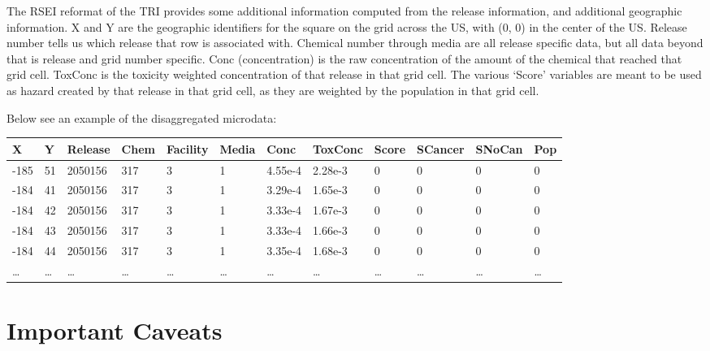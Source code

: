 \documentclass[12pt,twoside]{dukestatscithesis}
\theoremstyle{definition}
\theoremstyle{definition}
\theoremstyle{definition}
\theoremstyle{remark}
\begin{document}
The RSEI reformat of the TRI provides some additional information
computed from the release information, and additional geographic
information. X and Y are the geographic identifiers for the square on
the grid across the US, with (0, 0) in the center of the US. Release
number tells us which release that row is associated with. Chemical
number through media are all release specific data, but all data beyond
that is release and grid number specific. Conc (concentration) is the
raw concentration of the amount of the chemical that reached that grid
cell. ToxConc is the toxicity weighted concentration of that release in
that grid cell. The various `Score' variables are meant to be used as
hazard created by that release in that grid cell, as they are weighted
by the population in that grid cell.

Below see an example of the disaggregated microdata:
\begin{longtable}[]{@{}llllllllllll@{}}
\toprule
X & Y & Release & Chem & Facility & Media & Conc & ToxConc & Score &
SCancer & SNoCan & Pop\tabularnewline
\midrule
\endhead
-185 & 51 & 2050156 & 317 & 3 & 1 & 4.55e-4 & 2.28e-3 & 0 & 0 & 0 &
0\tabularnewline
-184 & 41 & 2050156 & 317 & 3 & 1 & 3.29e-4 & 1.65e-3 & 0 & 0 & 0 &
0\tabularnewline
-184 & 42 & 2050156 & 317 & 3 & 1 & 3.33e-4 & 1.67e-3 & 0 & 0 & 0 &
0\tabularnewline
-184 & 43 & 2050156 & 317 & 3 & 1 & 3.33e-4 & 1.66e-3 & 0 & 0 & 0 &
0\tabularnewline
-184 & 44 & 2050156 & 317 & 3 & 1 & 3.35e-4 & 1.68e-3 & 0 & 0 & 0 &
0\tabularnewline
\ldots{} & \ldots{} & \ldots{} & \ldots{} & \ldots{} & \ldots{} &
\ldots{} & \ldots{} & \ldots{} & \ldots{} & \ldots{} &
\ldots{}\tabularnewline
\bottomrule
\end{longtable}
\section{Important Caveats}\label{important-caveats}
\end{document}
